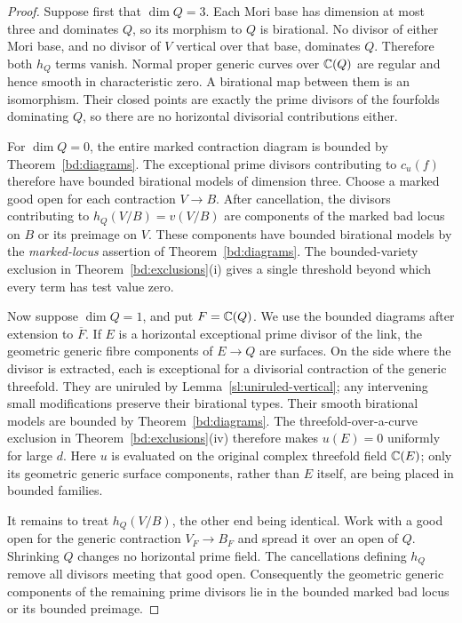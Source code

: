 \begin{proof}
Suppose first that $\dim Q=3$.  Each Mori base has dimension at most
three and dominates $Q$, so its morphism to $Q$ is birational.
No divisor of either Mori base, and no divisor of $V$ vertical over
that base, dominates $Q$.  Therefore both $h_Q$ terms vanish.
Normal proper generic curves over $\mathbb C(Q)$ are regular and hence
smooth in characteristic zero.  A birational map between them is an
isomorphism.  Their closed points are exactly the prime divisors of
the fourfolds dominating $Q$, so there are no horizontal divisorial
contributions either.

For $\dim Q=0$, the entire marked contraction diagram is bounded by
Theorem~\ref{bd:diagrams}.  The exceptional prime divisors contributing
to $c_u(f)$ therefore have bounded birational models of dimension
three.  Choose a marked good open for each contraction $V\to B$.
After cancellation, the divisors contributing to $h_Q(V/B)=v(V/B)$
are components of the marked bad locus on $B$ or its preimage on
$V$.  These components have bounded birational models by the
\emph{marked-locus} assertion of Theorem~\ref{bd:diagrams}.
The bounded-variety exclusion in Theorem~\ref{bd:exclusions}\textup{(i)} gives a
single threshold beyond which every term has test value zero.

Now suppose $\dim Q=1$, and put $F=\mathbb C(Q)$.  We use the bounded
diagrams after extension to $\overline F$.  If $E$ is a horizontal
exceptional prime divisor of the link, the geometric generic fibre
components of $E\to Q$ are surfaces.  On the side where the divisor
is extracted, each is exceptional for a divisorial contraction of
the generic threefold.  They are uniruled by
Lemma~\ref{sl:uniruled-vertical}; any intervening small modifications
preserve their birational types.  Their smooth birational models are
bounded by Theorem~\ref{bd:diagrams}.  The threefold-over-a-curve
exclusion in Theorem~\ref{bd:exclusions}\textup{(iv)} therefore makes
$u(E)=0$ uniformly for large $d$.  Here $u$ is evaluated on the original
complex threefold field $\mathbb C(E)$; only its geometric generic surface
components, rather than $E$ itself, are being placed in bounded families.

It remains to treat $h_Q(V/B)$, the other end being identical.  Work
with a good open for the generic contraction
$V_F\to B_F$ and spread it over an open of $Q$.  Shrinking $Q$ changes
no horizontal prime field.  The cancellations defining $h_Q$ remove
all divisors meeting that good open.  Consequently the geometric
generic components of the remaining prime divisors lie in the
bounded marked bad locus or its bounded preimage.


\end{proof}
